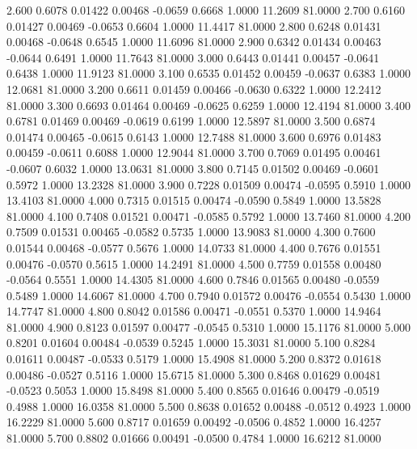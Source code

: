    2.600   0.6078   0.01422   0.00468  -0.0659   0.6668   1.0000  11.2609  81.0000
   2.700   0.6160   0.01427   0.00469  -0.0653   0.6604   1.0000  11.4417  81.0000
   2.800   0.6248   0.01431   0.00468  -0.0648   0.6545   1.0000  11.6096  81.0000
   2.900   0.6342   0.01434   0.00463  -0.0644   0.6491   1.0000  11.7643  81.0000
   3.000   0.6443   0.01441   0.00457  -0.0641   0.6438   1.0000  11.9123  81.0000
   3.100   0.6535   0.01452   0.00459  -0.0637   0.6383   1.0000  12.0681  81.0000
   3.200   0.6611   0.01459   0.00466  -0.0630   0.6322   1.0000  12.2412  81.0000
   3.300   0.6693   0.01464   0.00469  -0.0625   0.6259   1.0000  12.4194  81.0000
   3.400   0.6781   0.01469   0.00469  -0.0619   0.6199   1.0000  12.5897  81.0000
   3.500   0.6874   0.01474   0.00465  -0.0615   0.6143   1.0000  12.7488  81.0000
   3.600   0.6976   0.01483   0.00459  -0.0611   0.6088   1.0000  12.9044  81.0000
   3.700   0.7069   0.01495   0.00461  -0.0607   0.6032   1.0000  13.0631  81.0000
   3.800   0.7145   0.01502   0.00469  -0.0601   0.5972   1.0000  13.2328  81.0000
   3.900   0.7228   0.01509   0.00474  -0.0595   0.5910   1.0000  13.4103  81.0000
   4.000   0.7315   0.01515   0.00474  -0.0590   0.5849   1.0000  13.5828  81.0000
   4.100   0.7408   0.01521   0.00471  -0.0585   0.5792   1.0000  13.7460  81.0000
   4.200   0.7509   0.01531   0.00465  -0.0582   0.5735   1.0000  13.9083  81.0000
   4.300   0.7600   0.01544   0.00468  -0.0577   0.5676   1.0000  14.0733  81.0000
   4.400   0.7676   0.01551   0.00476  -0.0570   0.5615   1.0000  14.2491  81.0000
   4.500   0.7759   0.01558   0.00480  -0.0564   0.5551   1.0000  14.4305  81.0000
   4.600   0.7846   0.01565   0.00480  -0.0559   0.5489   1.0000  14.6067  81.0000
   4.700   0.7940   0.01572   0.00476  -0.0554   0.5430   1.0000  14.7747  81.0000
   4.800   0.8042   0.01586   0.00471  -0.0551   0.5370   1.0000  14.9464  81.0000
   4.900   0.8123   0.01597   0.00477  -0.0545   0.5310   1.0000  15.1176  81.0000
   5.000   0.8201   0.01604   0.00484  -0.0539   0.5245   1.0000  15.3031  81.0000
   5.100   0.8284   0.01611   0.00487  -0.0533   0.5179   1.0000  15.4908  81.0000
   5.200   0.8372   0.01618   0.00486  -0.0527   0.5116   1.0000  15.6715  81.0000
   5.300   0.8468   0.01629   0.00481  -0.0523   0.5053   1.0000  15.8498  81.0000
   5.400   0.8565   0.01646   0.00479  -0.0519   0.4988   1.0000  16.0358  81.0000
   5.500   0.8638   0.01652   0.00488  -0.0512   0.4923   1.0000  16.2229  81.0000
   5.600   0.8717   0.01659   0.00492  -0.0506   0.4852   1.0000  16.4257  81.0000
   5.700   0.8802   0.01666   0.00491  -0.0500   0.4784   1.0000  16.6212  81.0000
